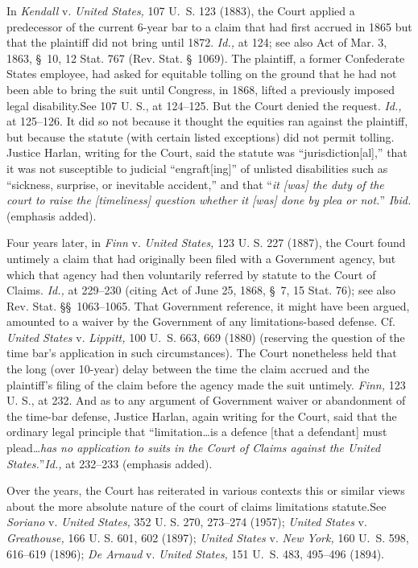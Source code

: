   In \emph{Kendall} v. \emph{United States,} 107 U.~S. 123 (1883), the Court applied a predecessor of the current 6-year bar to a claim that had first accrued in 1865 but that the plaintiff did not bring until 1872. \emph{Id.,} at 124; see also Act of Mar. 3, 1863, \S~10, 12 Stat. 767 (Rev. Stat. \S~1069). The plaintiff, a former Confederate States employee, had asked for equitable tolling on the ground that he had not been able to bring the suit until Congress, in 1868, lifted a previously imposed legal disability.See 107 U. S., at 124--125. But the Court denied the request. \emph{Id.,} at 125--126. It did so not because it thought the equities ran against the plaintiff, but because the statute (with certain listed exceptions) did not permit tolling. Justice Harlan, writing for the Court, said the statute was ``jurisdiction[al],'' that it was not susceptible to judicial ``engraft[ing]'' of unlisted disabilities such as ``sickness, surprise, or inevitable accident,'' and that ``\emph{it [was] the duty of the court to raise the [timeliness] question whether it [was] done by plea or not.}'' \emph{Ibid.} (emphasis added).

  Four years later, in \emph{Finn} v. \emph{United States,} 123 U. S. 227 (1887), the Court found untimely a claim that had originally been filed with a Government agency, but which that agency had then voluntarily referred by statute to the Court of Claims. \emph{Id.,} at 229--230 (citing Act of June 25, 1868, \S~7, 15 Stat. 76); see also Rev. Stat. \S\S~1063--1065. That Government reference, it might have been argued, amounted to a \newpage  waiver by the Government of any limitations-based defense. Cf. \emph{United States} v. \emph{Lippitt,} 100 U.~S. 663, 669 (1880) (reserving the question of the time bar's application in such circumstances). The Court nonetheless held that the long (over 10-year) delay between the time the claim accrued and the plaintiff's filing of the claim before the agency made the suit untimely. \emph{Finn,} 123 U. S., at 232. And as to any argument of Government waiver or abandonment of the time-bar defense, Justice Harlan, again writing for the Court, said that the ordinary legal principle that ``limitation\dots is a defence [that a defendant] must plead\dots \emph{has no application to suits in the Court of Claims against the United States.}''\emph{Id.,} at 232--233 (emphasis added).

  Over the years, the Court has reiterated in various contexts this or similar views about the more absolute nature of the court of claims limitations statute.See \emph{Soriano} v. \emph{United States,} 352 U. S. 270, 273--274 (1957); \emph{United States} v. \emph{Greathouse,} 166 U. S. 601, 602 (1897); \emph{United States} v. \emph{New York,} 160 U.~S. 598, 616--619 (1896); \emph{De Arnaud} v. \emph{United States,} 151 U.~S. 483, 495--496 (1894).

